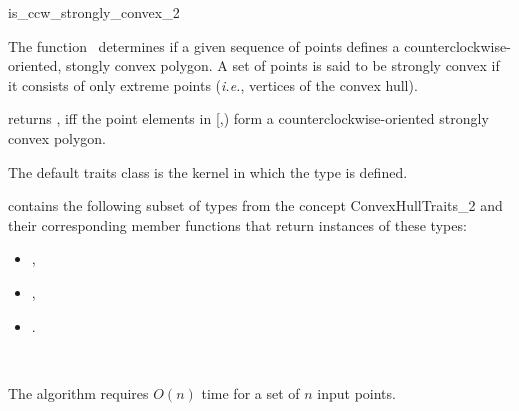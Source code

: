 

\begin{ccRefFunction}{is_ccw_strongly_convex_2}  

\ccDefinition
  
The function \ccRefName\ determines if a given sequence of points defines
a counterclockwise-oriented, stongly convex polygon.  
A set of points is said to be strongly convex 
if it consists of only extreme points
(\textit{i.e.}, vertices of the convex hull).


           {returns , iff the point elements in 
            [,)
            form a counterclockwise-oriented strongly convex polygon.
           }


The default traits class  is the kernel in which the
type  is defined.

 contains the following subset of types from
the concept ConvexHullTraits\_2 and their corresponding member
functions that return instances of these types:
\begin{itemize}
   \item {}, 
   \item {},
   \item {}.
\end{itemize}


\ccSeeAlso

 \\


\ccImplementation

The algorithm requires $O(n)$ time for a set of $n$ input points.


\end{ccRefFunction}


